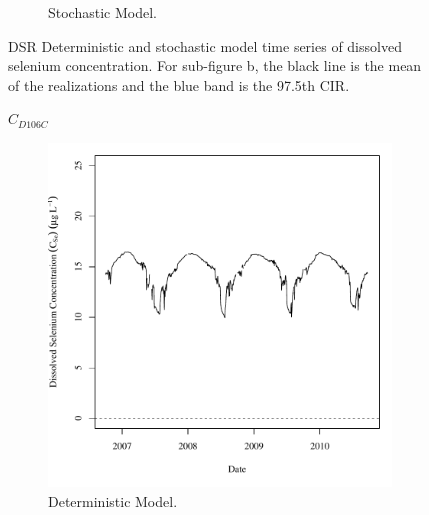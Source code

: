 \begin{landscape}
\begin{figure}
\begin{subfigure}{0.7\textwidth}
			\caption{Stochastic Model.}
		\end{subfigure}
		\caption[DSR Deterministic and stochastic model time series of dissolved selenium concentration.]{DSR Deterministic and stochastic model time series of dissolved selenium concentration.  For sub-figure b, the black line is the mean of the realizations and the blue band is the 97.5th CIR.}
		\label{fig:concCSeTS_DS}
	\end{figure}
\end{landscape}

\subfiguremid
\begin{landscape}
	\begin{figure}
		$ C_{D106C} $
		\begin{subfigure}{0.7\textwidth}
			\centering
			\includegraphics[width=\tableCustomSize]{"Figures/Results_DSR/Deterministic/c TS D106C"}
			\caption{Deterministic Model.}
		\end{subfigure}%
		\begin{subfigure}{0.7\textwidth}
			\centering

\end{subfigure}
\end{figure}
\end{landscape}

